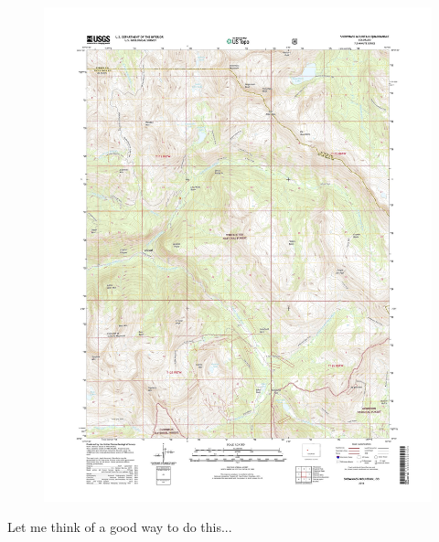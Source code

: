 \documentclass[12pt]{article} %
\begin{document}
\begin{problem}
\begin{figure}[H]
    \includegraphics[width=1.1\textwidth]{figures/snowmass_topo.jpg}
\end{figure}
\end{problem}
\begin{solution}
Let me think of a good way to do this...
\end{solution}
\end{document}
